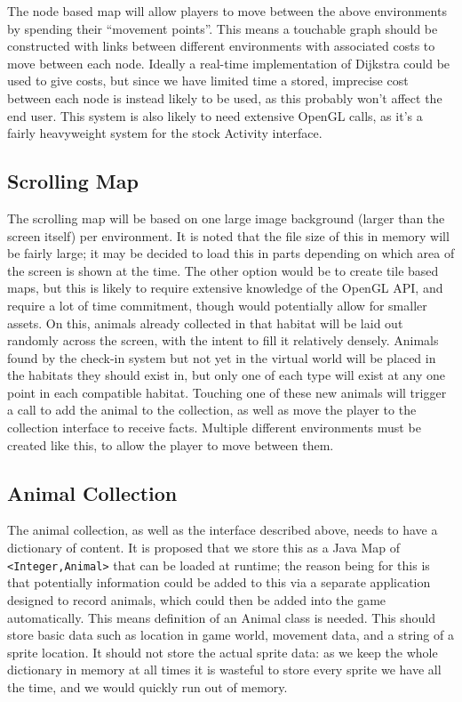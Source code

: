 \documentclass[12pt,a4paper,twoside]{article}
\begin{document}
The node based map will allow players to move between the above environments by spending their ``movement points''.
This means a touchable graph should be constructed with links between different environments with associated costs to move between each node.
Ideally a real-time implementation of Dijkstra could be used to give costs, but since we have limited time a stored, imprecise cost between each node is instead likely to be used, as this probably won't affect the end user.
This system is also likely to need extensive OpenGL calls, as it's a fairly heavyweight system for the stock Activity interface.

\subsection{Scrolling Map}
The scrolling map will be based on one large image background (larger than the screen itself) per environment.
It is noted that the file size of this in memory will be fairly large; it may be decided to load this in parts depending on which area of the screen is shown at the time.
The other option would be to create tile based maps, but this is likely to require extensive knowledge of the OpenGL API, and require a lot of time commitment, though would potentially allow for smaller assets.
On this, animals already collected in that habitat will be laid out randomly across the screen, with the intent to fill it relatively densely.
Animals found by the check-in system but not yet in the virtual world will be placed in the habitats they should exist in, but only one of each type will exist at any one point in each compatible habitat.
Touching one of these new animals will trigger a call to add the animal to the collection, as well as move the player to the collection interface to receive facts.
Multiple different environments must be created like this, to allow the player to move between them.

\subsection{Animal Collection}
The animal collection, as well as the interface described above, needs to have a dictionary of content.
It is proposed that we store this as a Java Map of \verb|<Integer,Animal>| that can be loaded at runtime; the reason being for this is that potentially information could be added to this via a separate application designed to record animals, which could then be added into the game automatically.
This means definition of an Animal class is needed.
This should store basic data such as location in game world, movement data, and a string of a sprite location. It should not store the actual sprite data: as we keep the whole dictionary in memory at all times it is wasteful to store every sprite we have all the time, and we would quickly run out of memory.
\end{document}
